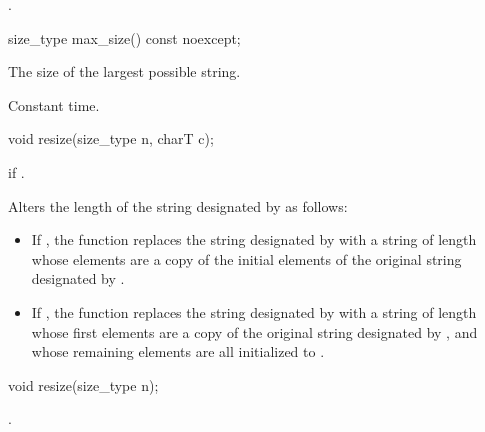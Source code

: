 \begin{itemdescr}
\pnum
\returns
{}.
\end{itemdescr}

%
%
\begin{itemdecl}
size_type max_size() const noexcept;
\end{itemdecl}

\begin{itemdescr}
\pnum
\returns
The size of the largest possible string.

\pnum
\complexity Constant time.
\end{itemdescr}

%
%
\begin{itemdecl}
void resize(size_type n, charT c);
\end{itemdecl}

\begin{itemdescr}
\pnum
\requires
{}

\pnum
\throws
{}
if
.

\pnum
\effects
Alters the length of the string designated by
as follows:

\begin{itemize}
\item
If
,
the function replaces the string designated by
with a string of length  whose elements are a
copy of the initial elements of the original string designated by
.
\item
If
,
the function replaces the string designated by
with a string of length  whose first
elements are a copy of the original string designated by
,
and whose remaining elements are all initialized to .
\end{itemize}
\end{itemdescr}

%
%
\begin{itemdecl}
void resize(size_type n);
\end{itemdecl}

\begin{itemdescr}
\pnum
\effects
{}.
\end{itemdescr}

